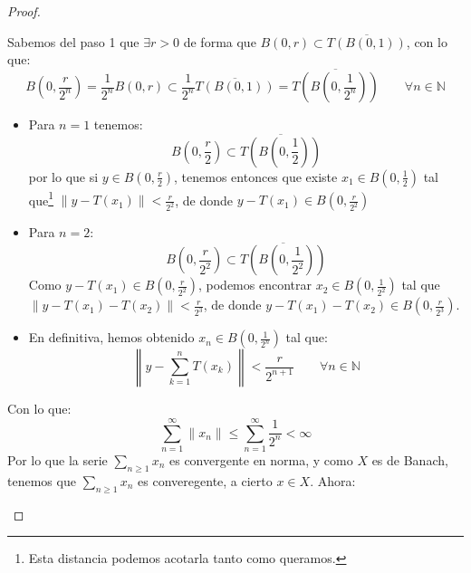 \begin{teo}
\begin{proof}
\begin{description}
                Sabemos del paso 1 que $\exists r>0$ de forma que $B(0,r)\subset \overline{T(B(0,1))}$, con lo que:
                \begin{equation*}
                    B\left(0,\frac{r}{2^n}\right) = \frac{1}{2^n}B(0,r) \subset \frac{1}{2^n}\overline{T(B(0,1))} = \overline{T\left(B\left(0,\frac{1}{2^n}\right)\right)} \qquad \forall n\in \mathbb{N}
                \end{equation*}
                \begin{itemize}
                    \item Para $n=1$ tenemos:
                        \begin{equation*}
                            B\left(0,\frac{r}{2}\right)\subset \overline{T\left(B\left(0,\frac{1}{2}\right)\right)}
                        \end{equation*}
                        por lo que si $y\in B\left(0,\frac{r}{2}\right)$, tenemos entonces que existe $x_1\in B\left(0,\frac{1}{2}\right)$ tal que\footnote{Esta distancia podemos acotarla tanto como queramos.} $\|y-T(x_1)\| < \frac{r}{2^2}$, de donde $y-T(x_1)\in B\left(0,\frac{r}{2^2}\right)$
                    \item Para $n=2$:
                        \begin{equation*}
                            B\left(0,\frac{r}{2^2}\right)\subset \overline{T\left(B\left(0,\frac{1}{2^2}\right)\right)}
                        \end{equation*}
                        Como $y-T(x_1)\in B\left(0,\frac{r}{2^2}\right)$, podemos encontrar $x_2\in B\left(0,\frac{1}{2^2}\right)$ tal que $\|y-T(x_1)-T(x_2)\| < \frac{r}{2^3}$, de donde $y-T(x_1)-T(x_2)\in B\left(0,\frac{r}{2^3}\right)$.
                    \item En definitiva, hemos obtenido $x_n \in B\left(0,\frac{1}{2^n}\right)$ tal que:
                        \begin{equation}\label{eq:suma_parcial}
                            \left\|y - \sum_{k=1}^{n}T(x_k)\right\| < \frac{r}{2^{n+1}} \qquad \forall n\in \mathbb{N}
                        \end{equation}
                \end{itemize}
                Con lo que:
                \begin{equation*}
                    \sum_{n=1}^{\infty}\|x_n\| \leq \sum_{n=1}^{\infty}\frac{1}{2^n} < \infty
                \end{equation*}
                Por lo que la serie $\sum\limits_{n\geq 1}x_n$ es convergente en norma, y como $X$ es de Banach, tenemos que $\sum\limits_{n\geq 1}x_n$ es converegente, a cierto $x\in X$. Ahora:

\end{description}
\end{proof}
\end{teo}
